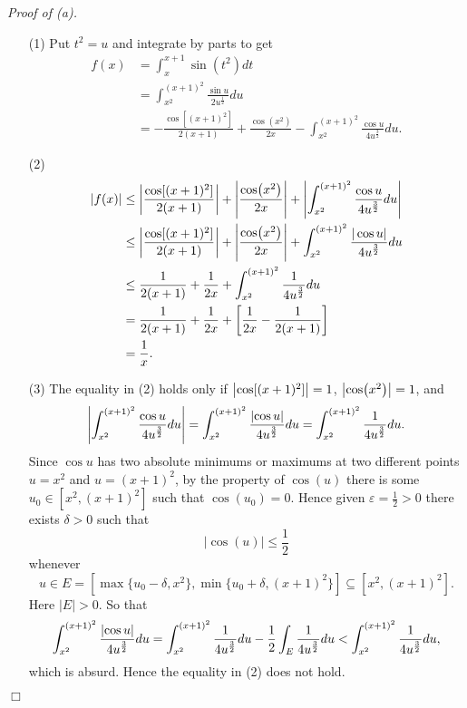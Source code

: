 \documentclass{article}
\begin{document}
\emph{Proof of (a).}
\begin{enumerate}
  \item[(1)]
  Put $t^2 = u$ and integrate by parts to get
  \begin{align*}
    f(x)
    &= \int_{x}^{x+1} \sin(t^2)dt \\
    &= \int_{x^2}^{(x+1)^2} \frac{\sin u}{2u^{\frac{1}{2}}} du \\
    &= - \frac{\cos[(x+1)^2]}{2(x+1)}
      + \frac{\cos(x^2)}{2x}
      - \int_{x^2}^{(x+1)^2} \frac{\cos u}{4u^{\frac{3}{2}}} du.
  \end{align*}

  \item[(2)]
  \begin{align*}
    |f(x)|
    &\leq \abs{ \frac{\cos[(x+1)^2]}{2(x+1)} }
      + \abs{ \frac{\cos(x^2)}{2x} }
      + \abs{ \int_{x^2}^{(x+1)^2} \frac{\cos u}{4u^{\frac{3}{2}}} du } \\
    &\leq \abs{ \frac{\cos[(x+1)^2]}{2(x+1)} }
      + \abs{ \frac{\cos(x^2)}{2x} }
      + \int_{x^2}^{(x+1)^2} \frac{|\cos u|}{4u^{\frac{3}{2}}} du \\
    &\leq \frac{1}{2(x+1)}
      + \frac{1}{2x}
      + \int_{x^2}^{(x+1)^2} \frac{1}{4u^{\frac{3}{2}}} du \\
    &= \frac{1}{2(x+1)}
      + \frac{1}{2x}
      + \left[ \frac{1}{2x} - \frac{1}{2(x+1)} \right] \\
    &= \frac{1}{x}.
  \end{align*}

  \item[(3)]
  The equality in (2) holds only if
  $\abs{ \cos[(x+1)^2] } = 1$, $\abs{ \cos(x^2) } = 1$,
  and
  \[
    \abs{ \int_{x^2}^{(x+1)^2} \frac{\cos u}{4u^{\frac{3}{2}}} du }
    = \int_{x^2}^{(x+1)^2} \frac{\abs{\cos u}}{4u^{\frac{3}{2}}} du
    = \int_{x^2}^{(x+1)^2} \frac{1}{4u^{\frac{3}{2}}} du.
  \]
  Since $\cos u$ has two absolute minimums or maximums at two different points
  $u = x^2$ and $u = (x+1)^2$, by the property of $\cos(u)$ there is some
  $u_0 \in [x^2,(x+1)^2]$ such that $\cos(u_0) = 0$.
  Hence given $\varepsilon = \frac{1}{2} > 0$ there exists $\delta > 0$
  such that
  \[
    |\cos(u)| \leq \frac{1}{2}
  \]
  whenever
  \[
    u \in E = [\max\{u_0-\delta,x^2\},\min\{u_0+\delta,(x+1)^2\}]
    \subseteq [x^2,(x+1)^2].
  \]
  Here $|E| > 0$.
  So that
  \[
    \int_{x^2}^{(x+1)^2} \frac{\abs{\cos u}}{4u^{\frac{3}{2}}} du
    = \int_{x^2}^{(x+1)^2} \frac{1}{4u^{\frac{3}{2}}} du
      - \frac{1}{2} \int_{E} \frac{1}{4u^{\frac{3}{2}}} du
    < \int_{x^2}^{(x+1)^2} \frac{1}{4u^{\frac{3}{2}}} du,
  \]
  which is absurd.
  Hence the equality in (2) does not hold.
\end{enumerate}
$\Box$ \\
\end{document}

